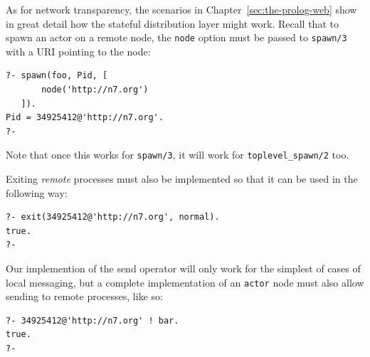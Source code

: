 
\noindent As for network transparency, the scenarios in Chapter~\ref{sec:the-prolog-web} show in great detail how the stateful distribution layer might work. Recall that to spawn an actor on a remote node, the \texttt{node} option must be passed to \texttt{spawn/3} with a URI pointing to the node:

\begin{verbatim}
?- spawn(foo, Pid, [
       node('http://n7.org')
   ]).
Pid = 34925412@'http://n7.org'.
?-
\end{verbatim}  

%
%
%
%
%


\noindent Note that once this works for \texttt{spawn/3}, it will work for \texttt{toplevel\_spawn/2} too.

Exiting \textit{remote} processes must also be implemented so that it can be used in the following way:

\begin{verbatim}
?- exit(34925412@'http://n7.org', normal).
true.
?-
\end{verbatim}

\noindent Our implemention of the send operator will only work for the simplest of cases of local messaging, but a complete implementation of an \texttt{actor} node must also allow sending to remote processes, like so:

\begin{verbatim}
?- 34925412@'http://n7.org' ! bar.
true.
?-
\end{verbatim} 

